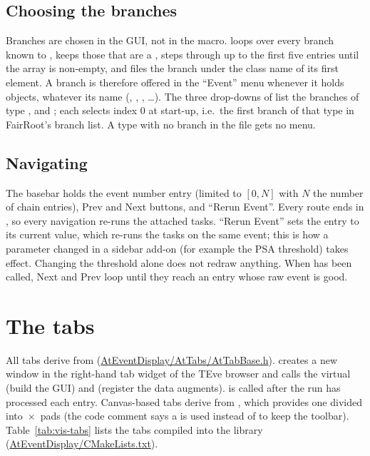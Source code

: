 \subsection{Choosing the branches}

Branches are chosen in the GUI, not in the macro.  loops over every
branch known to , keeps those that are a , steps through
up to the first five entries until the array is non-empty, and files the branch under the class
name of its first element. A branch is therefore offered in the ``Event'' menu whenever it holds
 objects, whatever its name (, ,
, \ldots). The three drop-downs of  list the
branches of type ,  and ; each selects
index 0 at start-up, i.e.\ the first branch of that type in FairRoot's branch list. A type with
no branch in the file gets no menu.

\subsection{Navigating}

The basebar holds the event number entry (limited to $[0, N]$ with $N$ the number of chain
entries), Prev and Next buttons, and ``Rerun Event''. Every route ends in
, so every navigation re-runs the attached tasks. ``Rerun Event'' sets the
entry to its current value, which re-runs the tasks on the same event; this is how a parameter
changed in a sidebar add-on (for example the PSA threshold) takes effect. Changing the threshold
alone does not redraw anything. When  has been called, Next and Prev loop
until they reach an entry whose raw event is good.

\section{The tabs}
\label{sec:vis-tabs}

All tabs derive from  (\url{AtEventDisplay/AtTabs/AtTabBase.h}).
 creates a new window in the right-hand tab widget of the TEve browser
and calls the virtual  (build the GUI) and  (register the data
augments).  is called after the run has processed each entry. Canvas-based tabs
derive from , which provides one  divided into
\,$\times$\, pads (the code comment says a  is used instead of
 to keep the toolbar). Table~\ref{tab:vis-tabs} lists the tabs compiled
into the library (\url{AtEventDisplay/CMakeLists.txt}).

